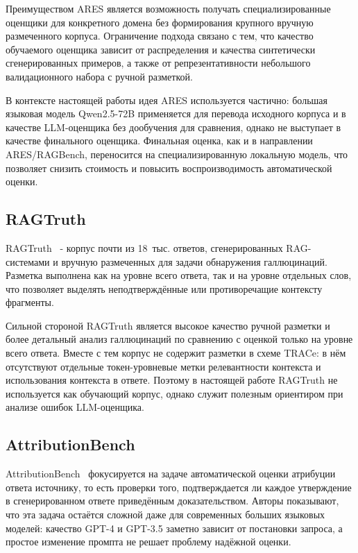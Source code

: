 Преимуществом ARES является возможность получать специализированные 
оценщики для конкретного домена без формирования крупного вручную 
размеченного корпуса. Ограничение подхода связано с тем, что качество 
обучаемого оценщика зависит от распределения и качества синтетически 
сгенерированных примеров, а также от репрезентативности небольшого 
валидационного набора с ручной разметкой.

В контексте настоящей работы идея ARES используется частично: большая
языковая модель Qwen2.5-72B \cite{hui2024qwen2} применяется для перевода исходного корпуса
и в качестве LLM-оценщика без дообучения для сравнения, однако не выступает
в качестве финального оценщика. Финальная оценка, как и в направлении
ARES/RAGBench, переносится на специализированную локальную модель, что
позволяет снизить стоимость и повысить воспроизводимость автоматической оценки.

\subsection{RAGTruth}
\label{sec:ragtruth}

RAGTruth~\cite{niu2023ragtruth} - корпус почти из 18~тыс. ответов, 
сгенерированных RAG-системами и вручную размеченных для задачи обнаружения 
галлюцинаций. Разметка выполнена как на уровне всего ответа, так и на уровне 
отдельных слов, что позволяет выделять неподтверждённые или противоречащие 
контексту фрагменты. 

Сильной стороной RAGTruth является высокое качество ручной разметки и более 
детальный анализ галлюцинаций по сравнению с оценкой только на уровне всего 
ответа. Вместе с тем корпус не содержит разметки в схеме TRACe: в нём отсутствуют 
отдельные токен-уровневые метки релевантности контекста и использования 
контекста в ответе. Поэтому в настоящей работе RAGTruth не используется как 
обучающий корпус, однако служит полезным ориентиром при анализе ошибок 
LLM-оценщика.

\subsection{AttributionBench}
\label{sec:attribution}

AttributionBench~\cite{li2024attributionbench} фокусируется на задаче 
автоматической оценки атрибуции ответа источнику, то есть проверки того, 
подтверждается ли каждое утверждение в сгенерированном ответе приведённым 
доказательством. Авторы показывают, что эта задача остаётся сложной даже 
для современных больших языковых моделей: качество GPT-4 и GPT-3.5 заметно 
зависит от постановки запроса, а простое изменение промпта не решает проблему 
надёжной оценки.

